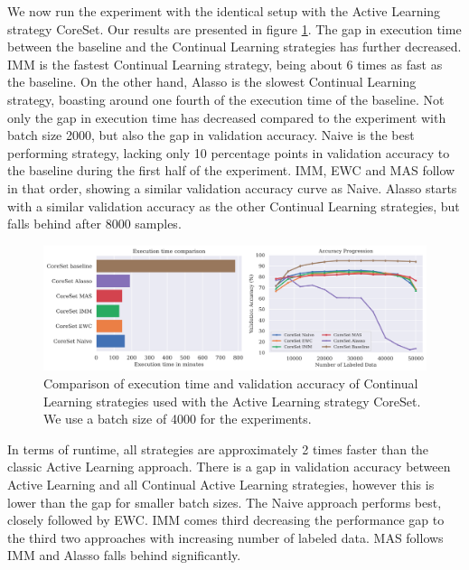 
We now run the experiment with the identical setup with the Active Learning strategy CoreSet. Our results are presented in figure \ref{fig:Evaluation:Results:CAL:CoreSet4000}. The gap in execution time between the baseline and the Continual Learning 
strategies has further decreased. IMM is the fastest Continual Learning strategy, being about 6 times as fast as the baseline. On the other hand, Alasso is the slowest Continual Learning strategy, boasting around one fourth of the execution time of the
baseline. Not only the gap in execution time has decreased compared to the experiment with batch size 2000, but also the gap in validation accuracy. Naive is the best performing strategy, lacking only 10 percentage points in validation accuracy to the
baseline during the first half of the experiment. IMM, EWC and MAS follow in that order, showing a similar validation accuracy curve as Naive. Alasso starts with a similar validation accuracy as the other Continual Learning strategies, but falls behind
after 8000 samples. \par


\begin{figure}[h]
    \centering
    \includegraphics[width=\linewidth]{images/results_CAL/CoreSet_CAL_4000b.png}
    \caption[Continual Active Learning CoreSet 4000 batch size]{Comparison of execution time and validation accuracy of Continual Learning strategies used with the Active Learning strategy
    CoreSet. We use a batch size of 4000 for the experiments.}
    \label{fig:Evaluation:Results:CAL:CoreSet4000}
\end{figure}

In terms of runtime, all
    strategies are approximately 2 times faster than the classic Active Learning approach. There is a gap in validation accuracy between Active Learning and all Continual
    Active Learning strategies, however this is lower than the gap for smaller batch sizes. The Naive approach performs best, closely followed by EWC. IMM comes third decreasing the
    performance gap to the third two approaches with increasing number of labeled data. MAS follows IMM and Alasso falls behind significantly.

